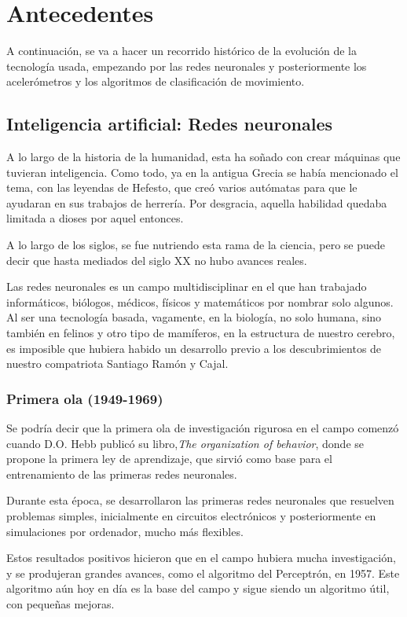 \documentclass[12pt]{book}
\numberwithin{equation}{section}
\begin{document}
\chapter{Antecedentes}
A continuación, se va a hacer un recorrido histórico de la evolución de la tecnología usada, empezando por las redes neuronales y posteriormente los acelerómetros y los algoritmos de clasificación de movimiento.
\section{Inteligencia artificial: Redes neuronales}
A lo largo de la historia de la humanidad, esta ha soñado con crear máquinas que tuvieran inteligencia. Como todo, ya en la antigua Grecia se había mencionado el tema, con las leyendas de Hefesto, que creó varios autómatas para que le ayudaran en sus trabajos de herrería. Por  desgracia, aquella habilidad quedaba limitada a dioses por aquel entonces.

A lo largo de los siglos, se fue nutriendo esta rama de la ciencia, pero se puede decir que hasta mediados del siglo XX no hubo avances reales.

Las redes neuronales es un campo multidisciplinar en el que han trabajado informáticos, biólogos, médicos, físicos y matemáticos por nombrar solo algunos. Al ser una tecnología basada, vagamente, en la biología, no solo humana, sino también en felinos y otro tipo de mamíferos, en la estructura de nuestro cerebro, es imposible que hubiera habido un desarrollo previo a los descubrimientos de nuestro compatriota Santiago Ramón y Cajal.

\subsection{Primera ola (1949-1969)}

Se podría decir que la primera ola de investigación rigurosa en el campo comenzó cuando D.O. Hebb publicó su libro,\textit{The organization of behavior}, donde se propone la primera ley de aprendizaje, que sirvió como base para el entrenamiento de las primeras redes neuronales.

Durante esta época, se desarrollaron las primeras redes neuronales que resuelven problemas simples, inicialmente en circuitos electrónicos y posteriormente en simulaciones por ordenador, mucho más flexibles.

Estos resultados positivos hicieron que en el campo hubiera mucha investigación, y se produjeran grandes avances, como el algoritmo del Perceptrón, en 1957\cite{rosenblatt1957perceptron}. Este algoritmo aún hoy en día es la base del campo y sigue siendo un algoritmo útil, con pequeñas mejoras.
\end{document}
